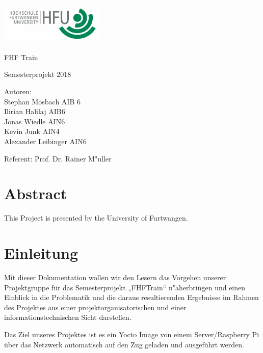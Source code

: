 \documentclass [a4paper,10pt] {article}
\begin{document}
\begin{titlepage}
	\raggedleft
	\includegraphics[width=5cm]{HFULogo}\par\vspace{1cm}

	\centering
	\vfill

	\LARGE FHF Train \par
	\vspace{1cm}
	
	\Large Semesterprojekt 2018 \\
	\vfill
	
	\Large Autoren: \\ 
	Stephan Mosbach AIB 6 \\
 	Ilirian Halilaj AIB6 \\ 
	Jonas Wiedle AIN6 \\ 
	Kevin Junk AIN4 \\
	Alexander Leibinger AIN6\par
	
	\vfill
	Referent: Prof. Dr. Rainer M"uller\par

	\vfill
\end{titlepage}

	\section*{Abstract}

	\vspace{5mm}

	This Project is presented by the University of Furtwangen.

\newpage

\tableofcontents

\newpage
	\section{Einleitung}
	
		Mit dieser Dokumentation wollen wir den Lesern das Vorgehen unserer Projektgruppe für das Semesterprojekt „FHFTrain“ n"aherbringen und einen Einblick in die 			
		Problematik und die daraus resultierenden Ergebnisse im Rahmen des Projektes aus einer projektorganisatorischen und einer informationstechnischen Sicht darstellen. \par
		Das Ziel unseres Projektes ist es ein Yocto Image von einem Server/Raspberry Pi über das Netzwerk automatisch auf den Zug geladen und ausgeführt werden.
	
\end{document}
